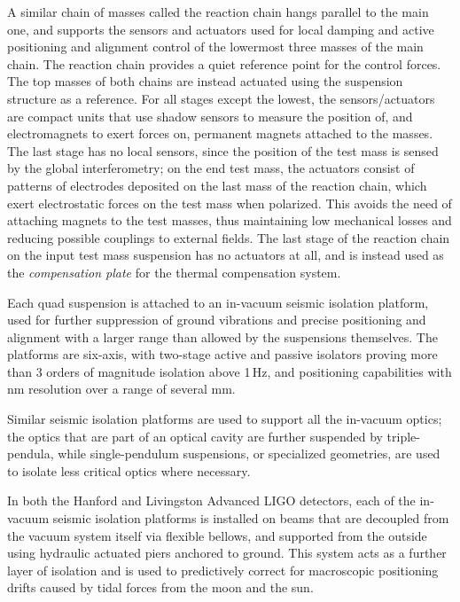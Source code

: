 A similar chain of masses called the reaction chain hangs parallel to the main one, 
and supports the sensors and actuators used for local damping and active positioning and alignment control 
of the lowermost three masses of the main chain. The reaction chain provides a quiet reference point 
for the control forces.
The top masses of both chains are instead actuated using the suspension structure as a reference.
For all stages except the lowest, the sensors/actuators are compact units that use shadow sensors to measure the position of, and electromagnets to exert forces on, permanent magnets attached to the masses.
The last stage has no local sensors, since the position of the test mass is sensed 
by the global interferometry; on the end test mass, the actuators consist of patterns of electrodes 
deposited on the last mass of the reaction chain, which exert electrostatic forces on the test mass when polarized.
This avoids the need of attaching magnets to the test masses, thus maintaining low mechanical 
losses and reducing possible couplings to external fields.
The last stage of the reaction chain on the input test mass suspension has no actuators at all, and is instead used as the \textit{compensation plate} for the thermal compensation system.

Each quad suspension is attached to an in-vacuum seismic isolation platform, 
used for further suppression of ground vibrations and precise positioning and 
alignment with a larger range than allowed by the suspensions themselves. The 
platforms are six-axis, with two-stage active and passive isolators proving more 
than 3 orders of magnitude isolation above 1\,Hz, and positioning capabilities 
with nm resolution over a range of several mm.

Similar seismic isolation platforms are used to support all the in-vacuum optics; 
the optics that are part of an optical cavity are further suspended by triple-pendula, while 
single-pendulum suspensions, or specialized geometries, are used to isolate 
less critical optics where necessary.

In both the Hanford and Livingston Advanced LIGO detectors, 
each of the in-vacuum seismic isolation platforms is 
installed on beams that are decoupled from the vacuum system itself via 
flexible bellows, and supported from the outside using hydraulic actuated 
piers anchored to ground.
This system acts as a further layer of isolation and is used to predictively correct for macroscopic positioning drifts caused by tidal forces from the moon and the sun.

